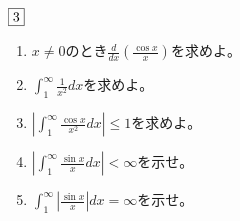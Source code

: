 \begin{tcolorbox} %
	$\fbox{3}$
\begin{enumerate}
	\item $x\ne 0$のとき$\frac{d}{dx}\left(\frac{\cos{x}}{x}\right)$を求めよ。
	\item $\int_1^\infty \frac{1}{x^2}dx$を求めよ。
	\item $\left|\int_1^\infty \frac{\cos{x}}{x^2}dx\right|\le 1$を求めよ。
	\item $\left|\int_1^\infty \frac{\sin{x}}{x} dx\right|< \infty$を示せ。
	\item $\int_1^\infty \left|\frac{\sin{x}}{x}\right|dx= \infty$を示せ。	
\end{enumerate}
\end{tcolorbox}

